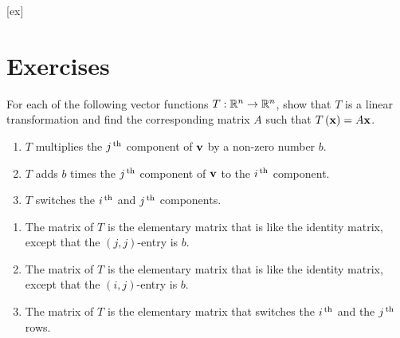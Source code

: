 [ex]
\section*{Exercises}

\begin{enumialphparenastyle}

\begin{ex}
  For each of the following vector functions $T:\mathbb{R}^{n}\to\mathbb{R}^{n}$, show
  that $T$ is a linear transformation and find the corresponding
  matrix $A$ such that $T\left(\mbox{\bf x}\right) = A\mbox{\bf x}$.
  \begin{enumerate}
  \item $T$ multiplies the $j^{\,\rm th}$ component of $\mbox{\bf v}$ by a
    non-zero number $b$.
  \item $T$ adds $b$ times the
    $j^{\,\rm th}$ component of $\mbox{\bf v}$ to the $i^{\,\rm th}$ component. 
  \item $T$ switches the $i^{\,\rm th}$ and $j^{\,\rm th}$ components.
  \end{enumerate}
  \begin{sol}
    \begin{enumerate}
    \item The matrix of $T$ is the elementary matrix that is like the
      identity matrix, except that the $(j,j)$-entry is $b$.
    \item The matrix of $T$ is the elementary matrix that is like the
      identity matrix, except that the $(i,j)$-entry is $b$. 
    \item The matrix of $T$ is the elementary matrix that switches the
      $i^{\,\rm th}$ and the $j^{\,\rm th}$ rows.
    \end{enumerate}
  \end{sol}
\end{ex}


\end{enumialphparenastyle}
